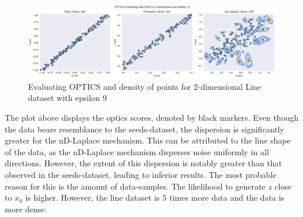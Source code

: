 \begin{figure}[H]
  \centering
  \includegraphics[width=1\linewidth]{Discussion/behaviour-2d-line-dataset&optics.png}
  \caption{Evaluating OPTICS and density of points for 2-dimensional Line dataset with epsilon 9}
  \label{fig:validation-Line-dataset_comparison_2d-laplace}
\end{figure}

The plot above displays the \gls{optics} scores, denoted by black markers. Even though the data bears resemblance to the seeds-dataset, the dispersion is significantly greater for the nD-Laplace mechanism. This can be attributed to the line shape of the data, as the nD-Laplace mechanism disperses noise uniformly in all directions. However, the extent of this dispersion is notably greater than that observed in the seeds-dataset, leading to inferior results. 
The most probable reason for this is the amount of data-samples. 
The likelihood to generate $z$ close to $x_0$ is higher. However, the line dataset is 5 times more data and the data is more dense.

